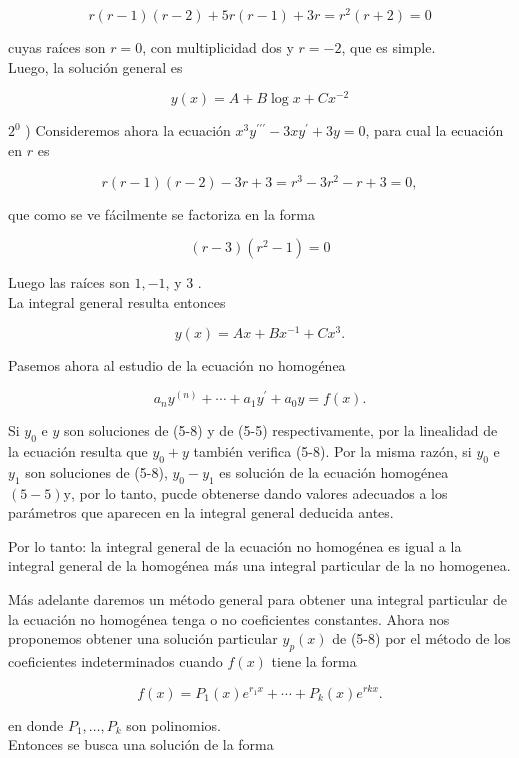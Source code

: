 \documentclass[10pt]{article}
\theoremstyle{plain}
\theoremstyle{definition}
\theoremstyle{remark}
\begin{document}
$$
r(r-1)(r-2)+5 r(r-1)+3 r=r^{2}(r+2)=0
$$

cuyas raíces son $r=0$, con multiplicidad dos y $r=-2$, que es simple.\\
Luego, la solución general es

$$
y(x)=A+B \log x+C x^{-2}
$$

$2^{0}$ ) Consideremos ahora la ecuación $x^{3} y^{\prime \prime \prime}-3 x y^{\prime}+3 y=0$, para cual la ecuación en $r$ es

$$
r(r-1)(r-2)-3 r+3=r^{3}-3 r^{2}-r+3=0,
$$

que como se ve fácilmente se factoriza en la forma

$$
(r-3)\left(r^{2}-1\right)=0
$$

Luego las raíces son $1,-1$, y 3 .\\
La integral general resulta entonces

$$
y(x)=A x+B x^{-1}+C x^{3} .
$$

Pasemos ahora al estudio de la ecuación no homogénea


\begin{equation*}
a_{n} y^{(n)}+\cdots+a_{1} y^{\prime}+a_{0} y=f(x) . \tag{5.8}
\end{equation*}


Si $y_{0}$ e $y$ son soluciones de (5-8) y de (5-5) respectivamente, por la linealidad de la ecuación resulta que $y_{0}+y$ también verifica (5-8). Por la misma razón, si $y_{0}$ e $y_{1}$ son soluciones de (5-8), $y_{0}-y_{1}$ es solución de la ecuación homogénea $(5-5) \mathrm{y}$, por lo tanto, pucde obtenerse dando valores adecuados a los parámetros que aparecen en la integral general deducida antes.

Por lo tanto: la integral general de la ecuación no homogénea es igual a la integral general de la homogénea más una integral particular de la no homogenea.

Más adelante daremos un método general para obtener una integral particular de la ecuación no homogénea tenga o no coeficientes constantes. Ahora nos proponemos obtener una solución particular $y_{p}(x)$ de (5-8) por el método de los coeficientes indeterminados cuando $f(x)$ tiene la forma


\begin{equation*}
f(x)=P_{1}(x) e^{r_{1} x}+\cdots+P_{k}(x) e^{r k x} . \tag{5-9}
\end{equation*}


en donde $P_{1}, \ldots, P_{k}$ son polinomios.\\
Entonces se busca una solución de la forma
\end{document}
